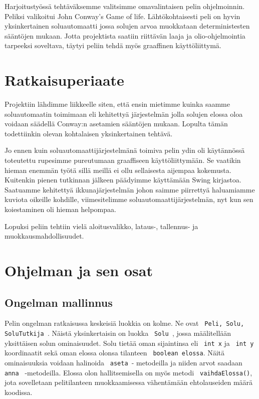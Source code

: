 Harjoitustyössä tehtäväksemme valitsimme omavalintaisen pelin ohjelmoinnin. Peliksi valikoitui John Conway’s Game of life. Lähtökohtaisesti peli on hyvin yksinkertainen soluautomaatti jossa solujen arvoa muokkataan deterministesten sääntöjen mukaan. Jotta projektista saatiin riittävän laaja ja olio-ohjelmointia tarpeeksi soveltava, täytyi peliin tehdä myös graaffinen käyttöliittymä.

\section{Ratkaisuperiaate}
Projektiin lähdimme liikkeelle siten, että ensin mietimme kuinka saamme soluautomaatin toimimaan eli kehitettyä järjestelmän jolla solujen elossa oloa voidaan säädellä Conway:n asetamien sääntöjen mukaan. Lopulta tämän todettiinkin olevan kohtalaisen yksinkertainen tehtävä.

Jo ennen kuin soluautomaattijärjestelmänä toimiva pelin ydin oli käytännössä toteutettu rupesimme pureutumaan graaffiseen käyttöliittymään. Se vaatikin hieman enemmän työtä sillä meillä ei ollu sellaisesta aijempaa kokemusta. Kuitenkin pienen tutkinnan jälkeen päädyimme käyttämään Swing kirjastoa. Saatuamme kehitettyä ikkunajärjestelmän johon saimme piirrettyä haluamiamme kuviota oikeille kohdille, viimesitelimme soluautomaattijärjestelmän, nyt kun sen koiestaminen oli hieman helpompaa. 

Lopuksi peliin tehtiin vielä aloitusvalikko, lataus-, tallennus- ja muokkausmahdollisuudet. 

\section{Ohjelman ja sen osat}
\subsection{Ongelman mallinnus}
Pelin ongelman ratkaisussa keskeisiä luokkia on kolme. Ne ovat \texttt { Peli, Solu, SoluTutkija }. Näistä yksinkertaisin on luokka \texttt{ Solu }, jossa määlitellään yksittäisen solun ominaisuudet. Solu tietää oman sijaintinsa eli \texttt{ int x} ja \texttt{ int y} koordinaatit sekä oman elossa olonsa tilanteen \texttt{ boolean elossa}. Näitä ominaisuuksia voidaan halinoida \texttt{ aseta }- metodeilla ja niiden arvot saadaan \texttt{ anna } -metodeilla. Elossa olon hallitsemisella on myös metodi \texttt{ vaihdaElossa()}, jota sovelletaan pelitilanteen muokkaamisessa vähentämään ehtolauseiden määrä koodissa. 

